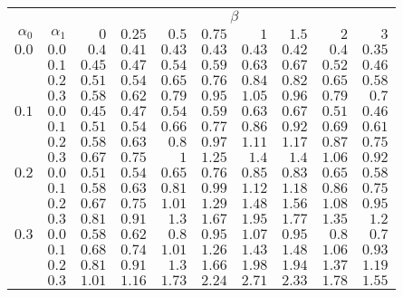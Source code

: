 \begin{tabular}{rr|rrrrrrrr}
\hline\hline
 && \multicolumn{8}{c}{$\beta$}\\
 $\alpha_0$ & $\alpha_1$ & $0$ & $0.25$ & $0.5$ & $0.75$ & $1$ & $1.5$ & $2$ & $3$ \\ 
 \hline
$0.0$ & $0.0$ & $0.4$ & $0.41$ & $0.43$ & $0.43$ & $0.43$ & $0.42$ & $0.4$ & $0.35$\\ 
 & $0.1$ & $0.45$ & $0.47$ & $0.54$ & $0.59$ & $0.63$ & $0.67$ & $0.52$ & $0.46$\\ 
 & $0.2$ & $0.51$ & $0.54$ & $0.65$ & $0.76$ & $0.84$ & $0.82$ & $0.65$ & $0.58$\\ 
 & $0.3$ & $0.58$ & $0.62$ & $0.79$ & $0.95$ & $1.05$ & $0.96$ & $0.79$ & $0.7$\\ 
\hline 
 $0.1$ & $0.0$ & $0.45$ & $0.47$ & $0.54$ & $0.59$ & $0.63$ & $0.67$ & $0.51$ & $0.46$\\ 
 & $0.1$ & $0.51$ & $0.54$ & $0.66$ & $0.77$ & $0.86$ & $0.92$ & $0.69$ & $0.61$\\ 
 & $0.2$ & $0.58$ & $0.63$ & $0.8$ & $0.97$ & $1.11$ & $1.17$ & $0.87$ & $0.75$\\ 
 & $0.3$ & $0.67$ & $0.75$ & $1$ & $1.25$ & $1.4$ & $1.4$ & $1.06$ & $0.92$\\ 
\hline 
 $0.2$ & $0.0$ & $0.51$ & $0.54$ & $0.65$ & $0.76$ & $0.85$ & $0.83$ & $0.65$ & $0.58$\\ 
 & $0.1$ & $0.58$ & $0.63$ & $0.81$ & $0.99$ & $1.12$ & $1.18$ & $0.86$ & $0.75$\\ 
 & $0.2$ & $0.67$ & $0.75$ & $1.01$ & $1.29$ & $1.48$ & $1.56$ & $1.08$ & $0.95$\\ 
 & $0.3$ & $0.81$ & $0.91$ & $1.3$ & $1.67$ & $1.95$ & $1.77$ & $1.35$ & $1.2$\\ 
\hline 
 $0.3$ & $0.0$ & $0.58$ & $0.62$ & $0.8$ & $0.95$ & $1.07$ & $0.95$ & $0.8$ & $0.7$\\ 
 & $0.1$ & $0.68$ & $0.74$ & $1.01$ & $1.26$ & $1.43$ & $1.48$ & $1.06$ & $0.93$\\ 
 & $0.2$ & $0.81$ & $0.91$ & $1.3$ & $1.66$ & $1.98$ & $1.94$ & $1.37$ & $1.19$\\ 
 & $0.3$ & $1.01$ & $1.16$ & $1.73$ & $2.24$ & $2.71$ & $2.33$ & $1.78$ & $1.55$\\ 
 \hline 
 \end{tabular}